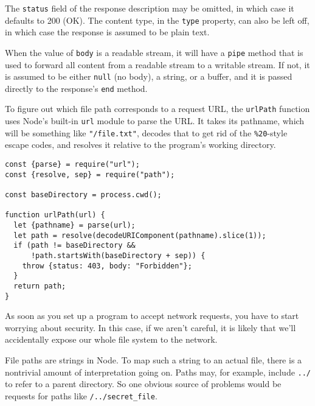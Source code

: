 The \lstinline`status` field of the response description may be omitted, in which case it defaults to 200 (OK). The content type, in the \lstinline`type` property, can also be left off, in which case the response is assumed to be plain text.

When the value of \lstinline`body` is a readable stream, it will have a \lstinline`pipe` method that is used to forward all content from a readable stream to a writable stream. If not, it is assumed to be either \lstinline`null` (no body), a string, or a buffer, and it is passed directly to the response's \lstinline`end` method.

To figure out which file path corresponds to a request URL, the \lstinline`urlPath` function uses Node's built-in \lstinline`url` module to parse the URL. It takes its pathname, which will be something like \lstinline`"/file.txt"`, decodes that to get rid of the \lstinline`%20`-style escape codes, and resolves it relative to the program's working directory.

\begin{lstlisting}
const {parse} = require("url");
const {resolve, sep} = require("path");

const baseDirectory = process.cwd();

function urlPath(url) {
  let {pathname} = parse(url);
  let path = resolve(decodeURIComponent(pathname).slice(1));
  if (path != baseDirectory &&
      !path.startsWith(baseDirectory + sep)) {
    throw {status: 403, body: "Forbidden"};
  }
  return path;
}
\end{lstlisting}
\noindent

As soon as you set up a program to accept network requests, you have to start worrying about security. In this case, if we aren't careful, it is likely that we'll accidentally expose our whole file
system to the network.

File paths are strings in Node. To map such a string to an actual file, there is a nontrivial amount of interpretation going on. Paths may, for example, include \lstinline`../` to refer to a parent directory. So one obvious source of problems would be requests for paths like \lstinline`/../secret_file`.

